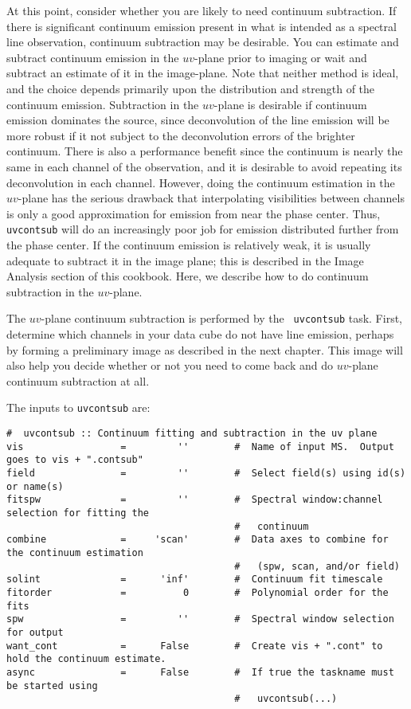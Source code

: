 At this point, consider whether you are likely to need continuum
subtraction.  If there is significant continuum emission present in
what is intended as a spectral line observation, continuum subtraction
may be desirable.  You can estimate and subtract continuum emission in
the $uv$-plane prior to imaging or wait and subtract an estimate of it
in the image-plane.  Note that neither method is ideal, and the choice
depends primarily upon the distribution and strength of the continuum
emission.  Subtraction in the $uv$-plane is desirable if continuum emission dominates
the source, since deconvolution of the line emission will be more robust
if it not subject to the deconvolution errors of the brighter continuum.
There is also a performance benefit since the continuum is nearly the same
in each channel of the observation, and it is desirable to avoid repeating
its deconvolution in each channel.  However, doing the continuum
estimation in the $uv$-plane has the serious drawback that interpolating
visibilities between channels is only a good approximation for emission
from near the phase center.  Thus, {\tt uvcontsub} will do an increasingly
poor job for emission distributed further from the phase center. 
If the continuum emission is relatively weak,
it is usually adequate to subtract it in the image plane; this is
described in the Image Analysis section of this cookbook.  Here, we
describe how to do continuum subtraction in the $uv$-plane.

The $uv$-plane continuum subtraction is performed by the {\tt
  uvcontsub} task.  First, determine which channels in your data cube
do not have line emission, perhaps by forming a preliminary image as
described in the next chapter.  This image will also help you decide
whether or not you need to come back and do $uv$-plane continuum
subtraction at all. 


The inputs to {\tt uvcontsub} are:
\small
\begin{verbatim}
#  uvcontsub :: Continuum fitting and subtraction in the uv plane
vis                 =         ''        #  Name of input MS.  Output goes to vis + ".contsub"
field               =         ''        #  Select field(s) using id(s) or name(s)
fitspw              =         ''        #  Spectral window:channel selection for fitting the
                                        #   continuum
combine             =     'scan'        #  Data axes to combine for the continuum estimation
                                        #   (spw, scan, and/or field)
solint              =      'inf'        #  Continuum fit timescale
fitorder            =          0        #  Polynomial order for the fits
spw                 =         ''        #  Spectral window selection for output
want_cont           =      False        #  Create vis + ".cont" to hold the continuum estimate.
async               =      False        #  If true the taskname must be started using
                                        #   uvcontsub(...)
\end{verbatim}

